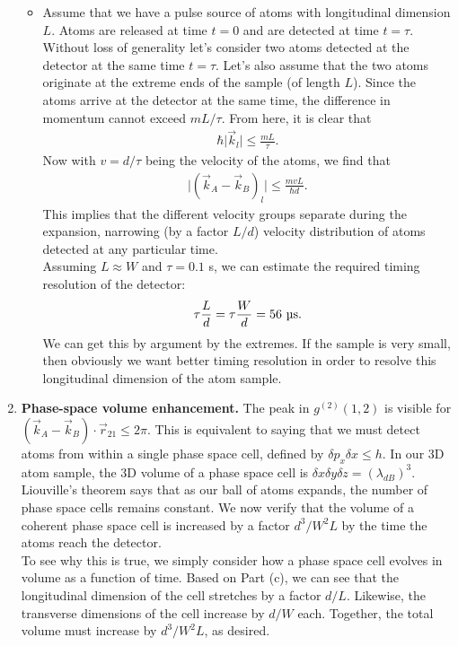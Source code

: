 \documentclass{article}
\theoremstyle{definition}
\newcommand{\f}[2]{\frac{#1}{#2}}
\begin{document}
\begin{enumerate}[label=(\alph*)]
\begin{itemize}
\item Assume that we have a pulse source of atoms with longitudinal dimension $L$. Atoms are released at time $t=0$ and are detected at time $t = \tau$.  Without loss of generality let's consider two atoms detected at the detector at the same time $t=\tau$. Let's also assume that the two atoms originate at the extreme ends of the sample (of length $L$).  Since the atoms arrive at the detector at the same time, the difference in momentum cannot exceed $mL/\tau$. From here, it is clear that
\begin{align*}
\hbar \vert{\vec{k}_l} \vert \leq \f{m L}{\tau}. 
\end{align*}
Now with $v = d/\tau$ being the velocity of the atoms, we find that
\begin{align*}
\vert (\vec{k}_A - \vec{k}_B)_l \vert \leq \f{mvL}{\hbar d}. 
\end{align*}
This implies that the different velocity groups separate during the expansion, narrowing (by a factor $L/d$)  velocity distribution of atoms detected at any particular time. \\

\noindent Assuming $L\approx W$ and $\tau = 0.1$ s, we can estimate the required timing resolution of the detector:
\begin{align*}
\tau \f{L}{d} = \tau \f{W}{d} = 56 \text{ \textmu s}.
\end{align*}
We can get this by argument by the extremes. If the sample is very small, then obviously we  want better timing resolution in order to resolve this longitudinal dimension of the atom sample. 


\end{itemize}

\item \textbf{Phase-space volume enhancement.} The peak in $g^{(2)}(1,2)$ is visible for $(\vec{k}_A - \vec{k}_B)\cdot \vec{r}_{21} \leq 2\pi$. This is equivalent to saying that we must detect atoms from within a single phase space cell, defined by $\delta p_x \delta x \leq h$. In our 3D atom sample, the 3D volume of a phase space cell is $\delta x \delta y \delta z = (\lambda_{dB})^3$. Liouville's theorem says that as our ball of atoms expands, the number of phase space cells remains constant. We now verify that the volume of a coherent phase space cell is increased by a factor $d^3 / W^2 L$ by the time the atoms reach the detector.\\

\noindent To see why this is true, we simply consider how a phase space cell evolves in volume as a function of time. Based on Part (c), we can see that the longitudinal dimension of the cell stretches by a factor $d/L$. Likewise, the transverse dimensions of the cell increase by $d/W$ each. Together, the total volume must increase by $d^3 / W^2 L$, as desired. \\


\end{enumerate}
\end{document}
